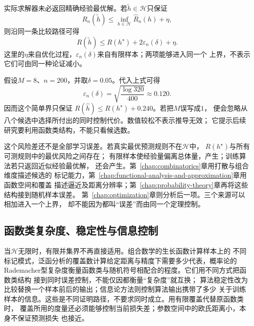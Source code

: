 实际求解器未必返回精确经验最优解。若$\widetilde h\in\mathcal H$只保证
\[
  \widehat{R}_n(\widetilde h)
  \leq
  \inf_{h\in\mathcal H}\widehat{R}_n(h)+\eta,
\]
则沿同一条比较路径可得
\[
  R(\widetilde h)
  \leq
  R(h^\star)+2\varepsilon_n(\delta)+\eta.
\]
这里的$\eta$来自优化过程，$\varepsilon_n(\delta)$来自有限样本；两项能够进入同一个
上界，不表示它们可由同一种论证减小。

\begin{example}[有限候选中的选择代价]
  \label{ex:future-finite-hypothesis-selection}
  假设$M=8$、$n=200$，并取$\delta=0.05$。代入上式可得
  \[
    \varepsilon_n(\delta)
    =
    \sqrt{\frac{\log 320}{400}}
    \approx 0.120.
  \]
  因而这个简单界只保证
  $R(\widehat h)\leq R(h^\star)+0.240$。若把$M$误写成$1$，
  便会忽略从八个候选中选择所付出的同时控制代价。数值较松不表示推导无效；
  它提示后续研究要利用函数类结构，不能只看候选数。
\end{example}

这个风险差还不是全部学习误差。若真实最优预测规则不在$\mathcal{H}$中，
$R(h^\star)$与所有可测规则中的最优风险之间存在；
有限样本使经验量偏离总体量，产生；训练算法若只返回近似经验最优解，
还会产生。第~\ref{chap:combinatorics}章用打散与组合维度描述候选的
标记能力，第~\ref{chap:functional-analysis-and-approximation}章用函数空间和覆盖
描述逼近及距离分辨率；第~\ref{chap:probability-theory}章再将这些结构接到随机样本误差。
第~\ref{chap:optimization}章则分析后一项。三个来源可以相加进入一个上界，
却不能因为都叫“误差”而由同一个定理控制。

\subsection{函数类复杂度、稳定性与信息控制}
\label{sec:future-function-classes-algorithms}

当$\mathcal{H}$无限时，有限并集界不再直接适用。组合数学的生长函数计算样本上的
不同标记模式，泛函分析的覆盖数计算给定距离与精度下需要多少代表，概率论的
Rademacher型复杂度衡量函数类与随机符号相配合的程度。它们用不同方式把函数类结构
接到同时误差控制，不能仅因都衡量“复杂度”就互换；
算法稳定性改为比较替换一个样本前后的输出；信息论方法则控制算法输出携带了多少
关于训练样本的信息。这些是不同证明路径，不要求同时成立。用有限覆盖代替原函数类时，
覆盖所用的度量还必须能够控制当前损失差；参数空间中的欧氏距离小，本身不保证预测损失
也接近。

